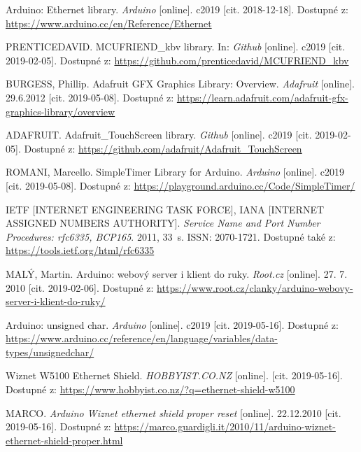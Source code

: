 \begin{thebibliography}{30}
Arduino: Ethernet library. \textit{Arduino} [online]. c2019 [cit. 2018-12-18]. Dostupné z: \url{https://www.arduino.cc/en/Reference/Ethernet}

PRENTICEDAVID. MCUFRIEND\_kbv library. In: \textit{Github} [online]. c2019 [cit. 2019-02-05]. Dostupné z: \url{https://github.com/prenticedavid/MCUFRIEND\_kbv}

BURGESS, Phillip. Adafruit GFX Graphics Library: Overview. \textit{Adafruit} [online]. 29.6.2012 [cit. 2019-05-08]. Dostupné z: \url{https://learn.adafruit.com/adafruit-gfx-graphics-library/overview}

ADAFRUIT. Adafruit\_TouchScreen library. \textit{Github} [online]. c2019 [cit. 2019-02-05]. Dostupné z: \url{https://github.com/adafruit/Adafruit\_TouchScreen}

ROMANI, Marcello. SimpleTimer Library for Arduino. \textit{Arduino} [online]. c2019 [cit. 2019-05-08]. Dostupné z: \url{https://playground.arduino.cc/Code/SimpleTimer/}

IETF [INTERNET ENGINEERING TASK FORCE], IANA [INTERNET ASSIGNED NUMBERS AUTHORITY]. \textit{Service Name and Port Number Procedures: rfc6335, BCP165}. 2011, 33~s. ISSN: 2070-1721. Dostupné také z: \url{https://tools.ietf.org/html/rfc6335}

MALÝ, Martin. Arduino: webový server i klient do ruky. \textit{Root.cz} [online]. 27. 7. 2010 [cit. 2019-02-06]. Dostupné z: \url{https://www.root.cz/clanky/arduino-webovy-server-i-klient-do-ruky/}

Arduino: unsigned char. \textit{Arduino} [online]. c2019 [cit. 2019-05-16]. Dostupné z: \url{https://www.arduino.cc/reference/en/language/variables/data-types/unsignedchar/}

Wiznet W5100 Ethernet Shield. \textit{HOBBYIST.CO.NZ} [online]. [cit. 2019-05-16]. Dostupné z: \url{https://www.hobbyist.co.nz/?q=ethernet-shield-w5100}

MARCO. \textit{Arduino Wiznet ethernet shield proper reset} [online]. 22.12.2010 [cit. 2019-05-16]. Dostupné z: \url{https://marco.guardigli.it/2010/11/arduino-wiznet-ethernet-shield-proper.html}

\end{thebibliography}
